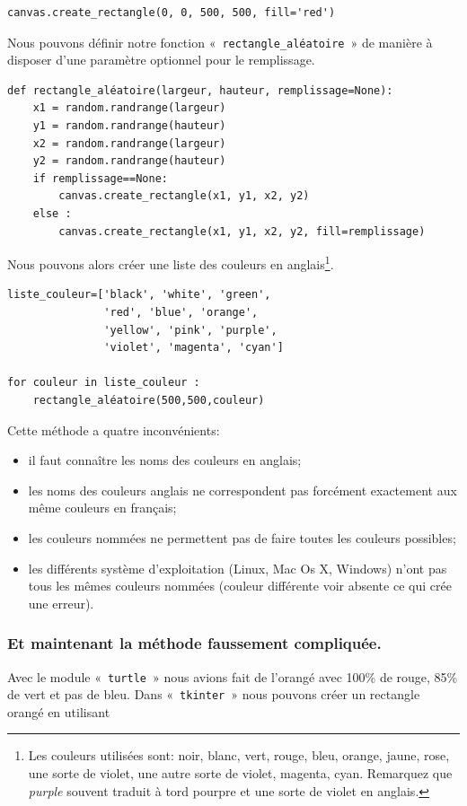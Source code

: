 \begin{Verbatim}[frame=single,rulecolor=\color{gray}, label=exemple]
canvas.create_rectangle(0, 0, 500, 500, fill='red')
\end{Verbatim}

Nous pouvons définir notre fonction « \texttt{rectangle\_aléatoire} »  de manière à disposer d'une paramètre optionnel pour le remplissage.

\begin{Verbatim}[frame=single,rulecolor=\color{mbleu}, label=à taper]
def rectangle_aléatoire(largeur, hauteur, remplissage=None):
    x1 = random.randrange(largeur)
    y1 = random.randrange(hauteur)
    x2 = random.randrange(largeur)
    y2 = random.randrange(hauteur)
    if remplissage==None:
        canvas.create_rectangle(x1, y1, x2, y2)
    else :	
        canvas.create_rectangle(x1, y1, x2, y2, fill=remplissage)
\end{Verbatim}

Nous pouvons alors créer une liste des couleurs en anglais\footnote{Les couleurs utilisées sont: noir, blanc, vert, rouge, bleu, orange, jaune, rose, une sorte de violet, une autre sorte de violet, magenta, cyan. Remarquez que \emph{purple} souvent traduit à tord pourpre et une sorte de violet en anglais.}. 

\begin{Verbatim}[frame=single,rulecolor=\color{mbleu}, label=à taper]
liste_couleur=['black', 'white', 'green',
               'red', 'blue', 'orange',
               'yellow', 'pink', 'purple',
               'violet', 'magenta', 'cyan']

for couleur in liste_couleur :
	rectangle_aléatoire(500,500,couleur)
\end{Verbatim}

Cette méthode a quatre inconvénients: 
\begin{itemize}
\item il faut connaître les noms des couleurs en anglais;
\item les noms des couleurs anglais ne correspondent pas forcément exactement aux même couleurs en français;
\item les couleurs nommées ne permettent pas de faire toutes les couleurs possibles;
\item les différents système d'exploitation (Linux, Mac Os X, Windows) n'ont pas tous les mêmes couleurs nommées (couleur différente voir absente ce qui crée une erreur).
\end{itemize}
\subsubsection*{Et maintenant la méthode faussement compliquée.}
Avec le module « \texttt{turtle} » nous avions fait de l'orangé avec 100\% de rouge, 85\% de vert et pas de bleu. Dans « \texttt{tkinter} » nous pouvons créer un rectangle orangé en utilisant

